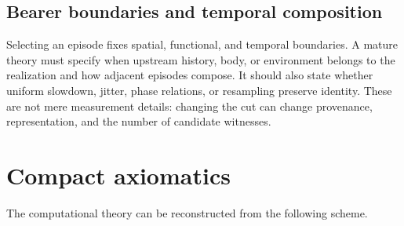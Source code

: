 \documentclass[11pt,a4paper]{article}
\theoremstyle{clean}
\theoremstyle{definition}
\begin{document}
\subsection{Bearer boundaries and temporal composition}

Selecting an episode fixes spatial, functional, and temporal boundaries. A mature theory must specify when upstream history, body, or environment belongs to the realization and how adjacent episodes compose. It should also state whether uniform slowdown, jitter, phase relations, or resampling preserve identity. These are not mere measurement details: changing the cut can change provenance, representation, and the number of candidate witnesses.

\section{Compact axiomatics}

The computational theory can be reconstructed from the following scheme.
\end{document}
